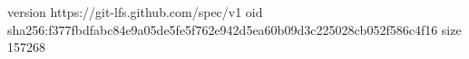 version https://git-lfs.github.com/spec/v1
oid sha256:f377fbdfabc84e9a05de5fe5f762e942d5ea60b09d3c225028cb052f586c4f16
size 157268
